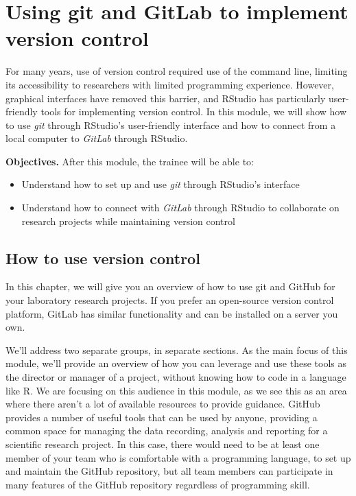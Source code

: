 \documentclass[]{tufte-book}
\providecommand{\tightlist}{%
  \setlength{\itemsep}{0pt}\setlength{\parskip}{0pt}}
\begin{document}
\section{Using git and GitLab to implement version control}\label{module11}

For many years, use of version control required use of the command line,
limiting its accessibility to researchers with limited programming experience.
However, graphical interfaces have removed this barrier, and RStudio has
particularly user-friendly tools for implementing version control. In this
module, we will show how to use \emph{git} through RStudio's user-friendly
interface and how to connect from a local computer to \emph{GitLab} through
RStudio.

\textbf{Objectives.} After this module, the trainee will be able to:

\begin{itemize}
\tightlist
\item
  Understand how to set up and use \emph{git} through RStudio's interface
\item
  Understand how to connect with \emph{GitLab} through RStudio to collaborate on\\
  research projects while maintaining version control
\end{itemize}

\subsection{How to use version control}\label{how-to-use-version-control}

In this chapter, we will give you an overview of how to use git and GitHub
for your laboratory research projects. If you prefer an open-source version
control platform, GitLab has similar functionality and can be installed on
a server you own.

We'll address two separate groups, in separate sections. As the main focus of
this module, we'll provide an overview of how you can leverage and use these
tools as the director or manager of a project, without knowing how to code in a
language like R. We are focusing on this audience in this module, as we see this
as an area where there aren't a lot of available resources to provide guidance.
GitHub provides a number of useful tools that can be used by anyone, providing a
common space for managing the data recording, analysis and reporting for a
scientific research project. In this case, there would need to be at least one
member of your team who is comfortable with a programming language, to set up
and maintain the GitHub repository, but all team members can participate in many
features of the GitHub repository regardless of programming skill.
\end{document}
